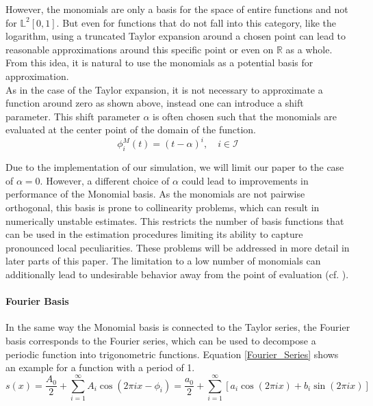 \documentclass[11pt,twoside,a4paper]{article}
\begin{document}
	However, the monomials are only a basis for the space of entire functions and not for $\mathbb{L}^2[0,1]$. But even for functions that do not fall into this category, like the logarithm, using a truncated Taylor expansion around a chosen point can lead to reasonable approximations around this specific point or even on $\mathbb{R}$ as a whole. From this idea, it is natural to use the monomials as a potential basis for approximation. \\
	As in the case of the Taylor expansion, it is not necessary to approximate a function around zero as shown above, instead one can introduce a shift parameter. This shift parameter $\alpha$ is often chosen such that the monomials are evaluated at the center point of the domain of the function.
	\begin{equation}
		\phi_{i}^{M}(t) = (t-\alpha)^i, \quad i \in \mathcal{I}
	\end{equation}

	Due to the implementation of our simulation, we will limit our paper to the case of $\alpha = 0$. However, a different choice of $\alpha$ could lead to improvements in performance of the Monomial basis.
	As the monomials are not pairwise orthogonal, this basis is prone to collinearity problems, which can result in numerically unstable estimates. This restricts the number of basis functions that can be used in the estimation procedures limiting its ability to capture pronounced local peculiarities. These problems will be addressed in more detail in later parts of this paper. The limitation to a low number of monomials can additionally lead to undesirable behavior away from the point of evaluation (cf. \cite{ramsay_functional_2005}).
	\vspace{-0.2cm}
	
	\paragraph{Fourier Basis}
	In the same way the Monomial basis is connected to the Taylor series, the Fourier basis corresponds to the Fourier series, which can be used to decompose a periodic function into trigonometric functions. Equation \ref{Fourier_Series} shows an example for a function with a period of 1.
	\begin{equation}\label{Fourier_Series}
		s(x) = \frac{A_0}{2} + \sum_{i = 1}^{\infty} A_i \cos(2\pi i x - \phi_i) = \frac{a_0}{2} + \sum_{i = 1}^{\infty}\left[a_i \cos(2\pi i x) + b_i \sin(2\pi i x)\right]
	\end{equation}
	
\end{document}
